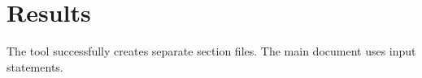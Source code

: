 \section{Results}
The tool successfully creates separate section files.
The main document uses input statements.